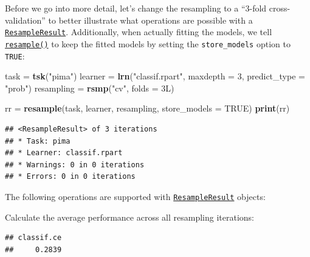 \documentclass[]{scrbook}
\newenvironment{Shaded}{\begin{snugshade}}{\end{snugshade}}
\newcommand{\DataTypeTok}[1]{\textcolor[rgb]{0.13,0.29,0.53}{#1}}
\newcommand{\DecValTok}[1]{\textcolor[rgb]{0.00,0.00,0.81}{#1}}
\newcommand{\KeywordTok}[1]{\textcolor[rgb]{0.13,0.29,0.53}{\textbf{#1}}}
\newcommand{\NormalTok}[1]{#1}
\newcommand{\OperatorTok}[1]{\textcolor[rgb]{0.81,0.36,0.00}{\textbf{#1}}}
\newcommand{\OtherTok}[1]{\textcolor[rgb]{0.56,0.35,0.01}{#1}}
\newcommand{\StringTok}[1]{\textcolor[rgb]{0.31,0.60,0.02}{#1}}
\renewenvironment{Shaded} {\begin{snugshade}\small} {\end{snugshade}}
\begin{document}
Before we go into more detail, let's change the resampling to a ``3-fold cross-validation'' to better illustrate what operations are possible with a \href{https://mlr3.mlr-org.com/reference/ResampleResult.html}{\texttt{ResampleResult}}.
Additionally, when actually fitting the models, we tell \href{https://mlr3.mlr-org.com/reference/resample.html}{\texttt{resample()}} to keep the fitted models by setting the \texttt{store\_models} option to \texttt{TRUE}:

\begin{Shaded}
\begin{Highlighting}[]
\NormalTok{task =}\StringTok{ }\KeywordTok{tsk}\NormalTok{(}\StringTok{"pima"}\NormalTok{)}
\NormalTok{learner =}\StringTok{ }\KeywordTok{lrn}\NormalTok{(}\StringTok{"classif.rpart"}\NormalTok{, }\DataTypeTok{maxdepth =} \DecValTok{3}\NormalTok{, }\DataTypeTok{predict_type =} \StringTok{"prob"}\NormalTok{)}
\NormalTok{resampling =}\StringTok{ }\KeywordTok{rsmp}\NormalTok{(}\StringTok{"cv"}\NormalTok{, }\DataTypeTok{folds =}\NormalTok{ 3L)}

\NormalTok{rr =}\StringTok{ }\KeywordTok{resample}\NormalTok{(task, learner, resampling, }\DataTypeTok{store_models =} \OtherTok{TRUE}\NormalTok{)}
\KeywordTok{print}\NormalTok{(rr)}
\end{Highlighting}
\end{Shaded}

\begin{verbatim}
## <ResampleResult> of 3 iterations
## * Task: pima
## * Learner: classif.rpart
## * Warnings: 0 in 0 iterations
## * Errors: 0 in 0 iterations
\end{verbatim}

The following operations are supported with \href{https://mlr3.mlr-org.com/reference/ResampleResult.html}{\texttt{ResampleResult}} objects:

Calculate the average performance across all resampling iterations:

\begin{Shaded}
\end{Shaded}

\begin{verbatim}
## classif.ce 
##     0.2839
\end{verbatim}
\end{document}
